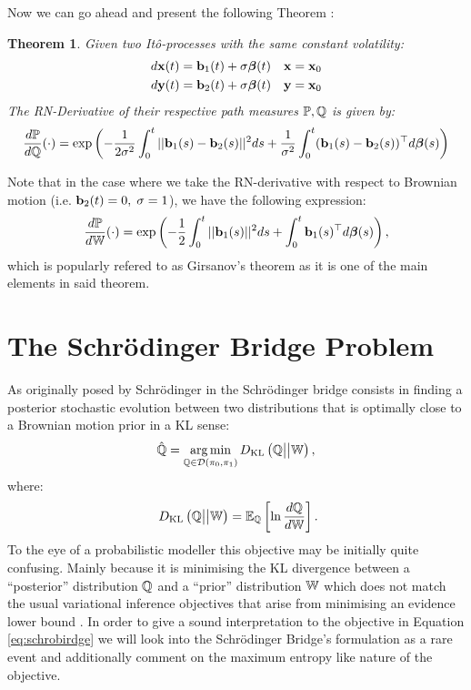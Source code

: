 \documentclass[a4paper,12pt,twoside,openright]{report}
\newtheorem{theorem}{Theorem}
\theoremstyle{definition}
\begin{document}
Now we can go ahead and present the following Theorem \citep{sarkka2019applied}:
\begin{theorem}\label{thrm:ito_ratio}\citep{sarkka2019applied}
Given two Itô-processes with the same constant volatility: 
    \begin{align*}
        d{\mathbf{x}}(t) = {\mathbf{b}}_1(t) + \sigma {\bm{\beta}}(t) \quad {\mathbf{x}} = {\mathbf{x}}_0\\
        d{\mathbf{y}}(t) = {\mathbf{b}}_2(t) + \sigma{\bm{\beta}}(t) \quad {\mathbf{y}} = {\mathbf{x}}_0
    \end{align*}
The RN-Derivative of their respective path measures ${\mathbb{P}},{\mathbb{Q}}$ is given by:
\begin{align} \label{eq:girsanov}
    \frac{d{\mathbb{P}}}{d{\mathbb{Q}}}(\cdot) = \exp\left(-\frac{1}{2\sigma^2}\int_0^t ||{\mathbf{b}}_1(s) - {\mathbf{b}}_2(s)||^2 ds + \frac{1}{\sigma^2}\int_0^t ({\mathbf{b}}_1(s) - {\mathbf{b}}_2(s))^{\top}d{\bm{\beta}}(s) \right)
\end{align}
\end{theorem}
Note that in the case where we take the RN-derivative with respect to Brownian motion (i.e. ${\mathbf{b}}_2(t) =0, \; \sigma=1$), we have the following expression:
\begin{align} \label{eq:girsanov_0}
    \frac{d{\mathbb{P}}}{d\mathbb{W}}(\cdot) = \exp\left(-\frac{1}{2}\int_0^t ||{\mathbf{b}}_1(s) ||^2 ds + \int_0^t {\mathbf{b}}_1(s)^{\top}d{\bm{\beta}}(s) \right),
\end{align}
which is popularly refered to as Girsanov's theorem as it is one of the main elements in said theorem.
\chapter{The Schrödinger Bridge Problem}

As originally posed by Schrödinger in \citep{schrodinger1931uber, schrodinger1932theorie} the Schrödinger bridge consists in finding a posterior stochastic evolution between two distributions that is optimally close to a Brownian motion prior in a KL sense:
\begin{align} \label{eq:schrobirdge}
    \hat{{\mathbb{Q}}}= \operatorname*{arg\,min}_{{\mathbb{Q}} \in {\mathcal{D}}(\pi_0, \pi_1)} D_{\mathrm{KL}}\left({\mathbb{Q}} \big|\big| \mathbb{W}\right),
\end{align}
where:
\begin{align} \label{eq:kl_sho}
    \ D_{\mathrm{KL}}\left({\mathbb{Q}} \big|\big| \mathbb{W}\right) = \mathbb{E}_{{\mathbb{Q}}}\left[\ln \frac{d{\mathbb{Q}}}{d\mathbb{W}}\right].
\end{align}
To the eye of a probabilistic modeller this objective may be initially quite confusing.  Mainly because it is minimising the KL divergence between a ``posterior'' distribution ${\mathbb{Q}}$ and a ``prior'' distribution $\mathbb{W}$ which does not match the usual variational inference objectives that arise from minimising an evidence lower bound \citep{yang2017understanding}. In order to give a sound interpretation to the objective in Equation \ref{eq:schrobirdge} we will look into the Schrödinger Bridge's formulation as a rare event and additionally comment on the maximum entropy like nature of the objective.
\end{document}
